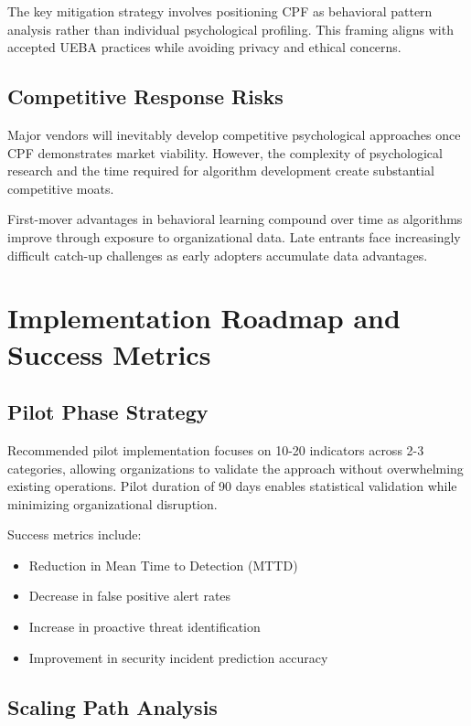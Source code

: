 \documentclass[11pt,a4paper]{article}
\begin{document}
The key mitigation strategy involves positioning CPF as behavioral pattern analysis rather than individual psychological profiling. This framing aligns with accepted UEBA practices while avoiding privacy and ethical concerns.

\subsection{Competitive Response Risks}

Major vendors will inevitably develop competitive psychological approaches once CPF demonstrates market viability. However, the complexity of psychological research and the time required for algorithm development create substantial competitive moats.

First-mover advantages in behavioral learning compound over time as algorithms improve through exposure to organizational data. Late entrants face increasingly difficult catch-up challenges as early adopters accumulate data advantages.

\section{Implementation Roadmap and Success Metrics}

\subsection{Pilot Phase Strategy}

Recommended pilot implementation focuses on 10-20 indicators across 2-3 categories, allowing organizations to validate the approach without overwhelming existing operations. Pilot duration of 90 days enables statistical validation while minimizing organizational disruption.

Success metrics include:
\begin{itemize}
\item Reduction in Mean Time to Detection (MTTD)
\item Decrease in false positive alert rates
\item Increase in proactive threat identification
\item Improvement in security incident prediction accuracy
\end{itemize}

\subsection{Scaling Path Analysis}
\end{document}
